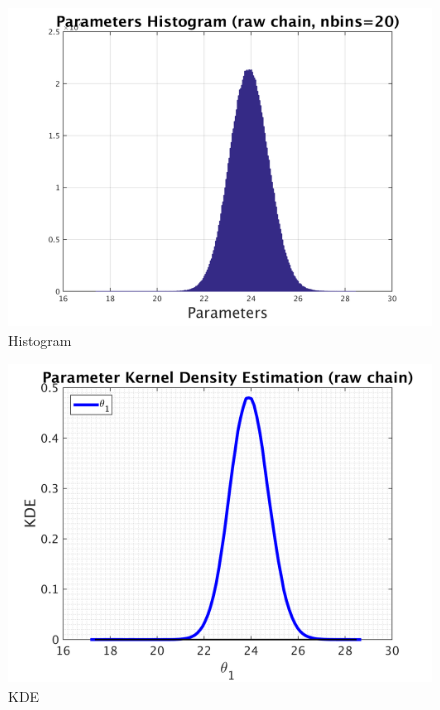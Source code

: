 \begin{figure}[H]
  
  \centering
   \includegraphics[scale=0.75]{100_results/outputData_1000000/simple_ip_hist_raw}
   \caption{Histogram}
\end{figure}



\begin{figure}[H]
  
  \centering
   \includegraphics[scale=0.75]{100_results/outputData_1000000/simple_ip_kde_raw}
   \caption{ KDE }
\end{figure}

